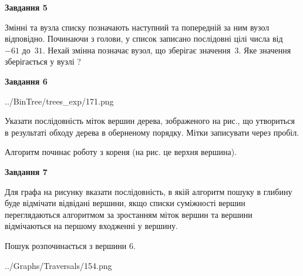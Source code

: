 \documentclass[12pt, ukrainian]{article}
\begin{document}
{\begin {large}
{\begin {center}\textbf{Завдання 5}\end {center}}\par
Змінні  та  вузла списку позначають наступний та попередній за ним вузол відповідно. Починаючи з голови, у список записано послідовні цілі числа від~$-61$ до~$31$. Нехай змінна  позначає вузол, що зберігає значення~$3$.
Яке значення зберігається у вузлі  ?\par
\newpage

{\begin {center}\textbf{Завдання 6}\end {center}}\par

\begin{center}
	{../BinTree/trees_exp/171.png}
\end{center}
Указати послідовність міток вершин дерева, зображеного на рис., що утвориться в результаті обходу дерева в оберненому порядку. Мітки записувати через пробіл.\par Алгоритм починає роботу з кореня (на рис. це верхня вершина).\par
\newpage

{\begin {center}\textbf{Завдання 7}\end {center}}\par
Для графа на рисунку вказати послідовність, в якій алгоритм пошуку в глибину буде відмічати відвідані вершини, якщо списки суміжності вершин переглядаються алгоритмом за зростанням міток вершин та вершини відмічаються на першому вход\-женні у вершину.\par
Пошук розпочинається з вершини 6.\par

\begin{center}
	{../Graphs/Traversals/154.png}
\end{center}\par
\newpage


\end{large}}
\end{document}
